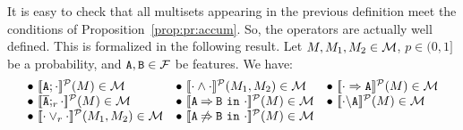 

It is easy to check that all multisets appearing in the previous
definition meet the conditions of Proposition~\ref{prop:pr:accum}. So,
the operators are actually well defined. This is formalized in the
following result.
\bprop\label{prp:domain:prob}
  Let  $M,M_{1}, M_{2}\in{\cal M}$,
  $p\in(0,1]$ be a probability, and
  $\mathtt{A},\mathtt{B}\in{\cal F}$ be features. We have:
$$ \begin{array}{lll}
\bullet\ \semdenp{\feature{A};\cdot}(M)\in\calM &
\bullet\ \semdenp{\cdot\paral\cdot}(M_{1},M_{2})\in\calM&
\bullet\ \semdenp{\mandatory{A}{\cdot}}(M)\in\calM\\
\bullet\ \semdenp{\ofeature{A};_{r}\cdot}(M)\in\calM&
\bullet\ \semdenp{\require{A}{B}{\cdot}}(M)\in\calM&
\bullet\ \semdenp{\forbid{A}{\cdot}}(M)\in\calM\\
\bullet\ \semdenp{\cdot\choice_{r}\cdot}(M_{1},M_{2})\in\calM&
\bullet\ \semdenp{\exclude{A}{B}{\cdot}}(M)\in\calM
  \end{array}$$

\eprop





